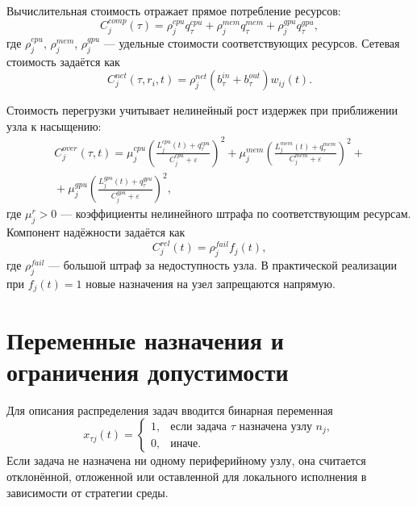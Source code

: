 Вычислительная стоимость отражает прямое потребление ресурсов:
\begin{equation}
    C^{comp}_j(\tau)=\rho^{cpu}_j q^{cpu}_{\tau}+\rho^{mem}_j q^{mem}_{\tau}+\rho^{gpu}_j q^{gpu}_{\tau},
    \label{eq:ch2_computational_cost}
\end{equation}
где $\rho^{cpu}_j$, $\rho^{mem}_j$, $\rho^{gpu}_j$ --- удельные стоимости соответствующих ресурсов. Сетевая стоимость задаётся как
\begin{equation}
    C^{net}_j(\tau,r_i,t)=\rho^{net}_j\left(b^{in}_{\tau}+b^{out}_{\tau}\right)w_{ij}(t).
    \label{eq:ch2_network_cost}
\end{equation}

Стоимость перегрузки учитывает нелинейный рост издержек при приближении узла к насыщению:
\begin{multline}
    C^{over}_j(\tau,t)=
    \mu^{cpu}_j\left(\frac{L^{cpu}_j(t)+q^{cpu}_{\tau}}{C^{cpu}_j+\varepsilon}\right)^2+
    \mu^{mem}_j\left(\frac{L^{mem}_j(t)+q^{mem}_{\tau}}{C^{mem}_j+\varepsilon}\right)^2+{}\\
    {}+\mu^{gpu}_j\left(\frac{L^{gpu}_j(t)+q^{gpu}_{\tau}}{C^{gpu}_j+\varepsilon}\right)^2,
    \label{eq:ch2_overload_cost}
\end{multline}
где $\mu^r_j>0$ --- коэффициенты нелинейного штрафа по соответствующим ресурсам. Компонент надёжности задаётся как
\begin{equation}
    C^{rel}_j(t)=\rho^{fail}_j f_j(t),
    \label{eq:ch2_reliability_cost}
\end{equation}
где $\rho^{fail}_j$ --- большой штраф за недоступность узла. В практической реализации при $f_j(t)=1$ новые назначения на узел запрещаются напрямую.

\section{Переменные назначения и ограничения допустимости}

Для описания распределения задач вводится бинарная переменная
\begin{equation}
    x_{\tau j}(t)=
    \begin{cases}
        1, & \text{если задача } \tau \text{ назначена узлу } n_j,\\
        0, & \text{иначе.}
    \end{cases}
    \label{eq:ch2_assignment_var}
\end{equation}
Если задача не назначена ни одному периферийному узлу, она считается отклонённой, отложенной или оставленной для локального исполнения в зависимости от стратегии среды.

